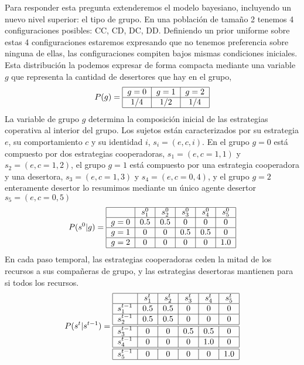 \documentclass[a4paper,10pt]{article}
\begin{document}
Para responder esta pregunta extenderemos el modelo bayesiano, incluyendo un nuevo nivel superior: el tipo de grupo.
En una población de tamaño 2 tenemos 4 configuraciones posibles: CC, CD, DC, DD.
Definiendo un prior uniforme sobre estas 4 configuraciones estaremos expresando que no tenemos preferencia sobre ninguna de ellas, las configuraciones compiten bajos mismas condiciones iniciales.
Esta distribución la podemos expresar de forma compacta mediante una variable $g$ que representa la cantidad de desertores que hay en el grupo,
%
\begin{align}
\centering
P(g) = \begin{tabular}{|c|c|c|c|}
        \hline
        $g=0$ & $g=1$ & $g=2$ \\ \hline
        $1/4$ & $1/2$ & $1/4$ \\ \hline
\end{tabular}
\end{align}
%
La variable de grupo $g$ determina la composición inicial de las estrategias coperativa al interior del grupo.
Los sujetos están caracterizados por su estrategia $e$, su comportamiento $c$ y su identidad $i$, $s_i=(e,c,i)$.
En el grupo $g=0$ está compuesto por dos estrategias cooperadoras, $s_1=(e,c=1,1)$ y $s_2=(e,c=1,2)$, el grupo $g=1$ está compuesto por una estrategia cooperadora y una desertora, $s_3=(e,c=1,3)$ y $s_4=(e,c=0,4)$, y el grupo $g=2$ enteramente desertor lo resumimos mediante un único agente desertor $s_5=(e,c=0,5)$
%
\begin{align}
\centering
P(s^0|g) = \begin{tabular}{|c|c|c|c|c|c|}
        \hline
        & $s^0_1$ & $s^0_2$ & $s^0_3$ &  $s^0_4$ & $s^0_5$ \\ \hline
       $g=0$ & $0.5$ & $0.5$ & $0$ &  $0$ & $0$  \\ \hline
       $g=1$ & $0$ & $0$ & $0.5$ & $0.5$ & $0$ \\ \hline
       $g=2$ & $0$ & $0$ & $0$ & $0$ & $1.0$ \\ \hline
\end{tabular}
\end{align}
%
En cada paso temporal, las estrategias cooperadoras ceden la mitad de los recursos a sus compañeras de grupo, y las estrategias desertoras mantienen para si todos los recursos.
%
\begin{align}
\centering
P(s^{t}|s^{t-1}) = \begin{tabular}{|c|c|c|c|c|c|}
        \hline
        & $s^t_1$ & $s^t_2$ & $s^t_3$ & $s^t_4$ & $s^t_5$ \\ \hline
       $s^{t-1}_1$ & $0.5$ & $0.5$ & $0$ &  $0$ & $0$  \\ \hline
       $s^{t-1}_2$ & $0.5$ & $0.5$ & $0$ & $0$ & $0$  \\ \hline \hline
       $s^{t-1}_3$ & $0$ & $0$ & $0.5$ & $0.5$ & $0$  \\ \hline
       $s^{t-1}_4$ & $0$ & $0$ & $0$ & $1.0$ & $0$  \\ \hline \hline
       $s^{t-1}_5$ & $0$ & $0$ & $0$ & $0$ & $1.0$  \\ \hline
\end{tabular}
\end{align}
\end{document}
